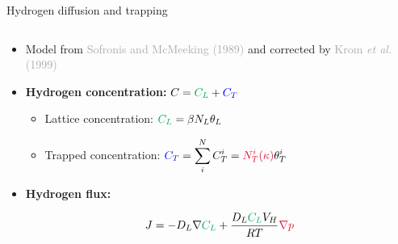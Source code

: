 \documentclass[9pt]{beamer}
\begin{document}
\begin{frame}{Hydrogen diffusion and trapping}

    \begin{columns}
    
        \begin{column}{0.8\textwidth}
    
            \begin{itemize}
                \item Model from \textcolor{darkgray}{Sofronis and McMeeking (1989)} and corrected by \textcolor{darkgray}{Krom \textit{et al.} (1999)}
                
                \vspace{0.35cm}
            
                \item \textbf{Hydrogen concentration:} \hspace{0.5cm} $ \displaystyle C = \textcolor{DarkGreen}{C_L} + \textcolor{blue}{C_T}$
    
                \begin{itemize}
                    \vspace{0.35cm}
                    \item Lattice concentration: \hspace{1.0cm} $\displaystyle \textcolor{DarkGreen}{C_L} = \beta N_L \theta_L$
                    
                    \vspace{0.35cm}
        
                    \item Trapped concentration: \hspace{0.1cm} $\displaystyle \textcolor{blue}{C_T} = \sum_i^N C_T^i = \textcolor{NewRed}{N_T^i(\kappa)} \theta_T^i$
    
                \end{itemize}
    
                \vspace{0.35cm}
    
                \item \textbf{Hydrogen flux:}
    
                \begin{equation*}
                    J = -D_L \nabla \textcolor{DarkGreen}{C_L} + \frac{D_L \textcolor{DarkGreen}{C_L} V_H}{RT} \textcolor{NewRed}{\nabla p}
                \end{equation*}
            

\end{itemize}
\end{column}
\end{columns}
\end{frame}
\end{document}
